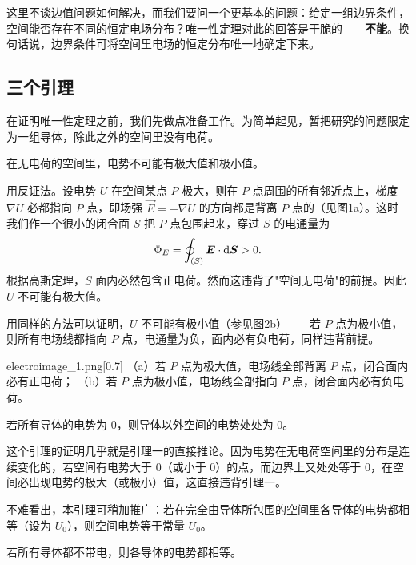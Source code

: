 这里不谈边值问题如何解决，而我们要问一个更基本的问题：给定一组边界条件，空间能否存在不同的恒定电场分布？唯一性定理对此的回答是干脆的——\textbf{不能}。换句话说，边界条件可将空间里电场的恒定分布唯一地确定下来。

\subsection{三个引理}

在证明唯一性定理之前，我们先做点准备工作。为简单起见，暂把研究的问题限定为一组导体，除此之外的空间里没有电荷。

\begin{law}
    在无电荷的空间里，电势不可能有极大值和极小值。
\end{law}

用反证法。设电势 $U$ 在空间某点 $P$ 极大，则在 $P$ 点周围的所有邻近点上，梯度 $\nabla U$ 必都指向 $P$ 点，即场强 $\vec{E} = -\nabla U$ 的方向都是背离 $P$ 点的（见图1a）。这时我们作一个很小的闭合面 $S$ 把 $P$ 点包围起来，穿过 $S$ 的电通量为
\[\Phi_E = \oint_{(S)} \vec{E} \cdot \dif \vec{S} > 0.\]
根据高斯定理，$S$ 面内必然包含正电荷。然而这违背了"空间无电荷"的前提。因此 $U$ 不可能有极大值。

用同样的方法可以证明，$U$ 不可能有极小值（参见图2b）——若 $P$ 点为极小值，则所有电场线都指向 $P$ 点，电通量为负，面内必有负电荷，同样违背前提。

\begin{singlefigure}{electroimage_1.png}[0.7]
    （a）若 $P$ 点为极大值，电场线全部背离 $P$ 点，闭合面内必有正电荷；
    （b）若 $P$ 点为极小值，电场线全部指向 $P$ 点，闭合面内必有负电荷。
\end{singlefigure}

\begin{law}
    若所有导体的电势为 $0$，则导体以外空间的电势处处为 $0$。
\end{law}

这个引理的证明几乎就是引理一的直接推论。因为电势在无电荷空间里的分布是连续变化的，若空间有电势大于 $0$（或小于 $0$）的点，而边界上又处处等于 $0$，在空间必出现电势的极大（或极小）值，这直接违背引理一。

不难看出，本引理可稍加推广：若在完全由导体所包围的空间里各导体的电势都相等（设为 $U_0$），则空间电势等于常量 $U_0$。

\begin{law}
    若所有导体都不带电，则各导体的电势都相等。
\end{law}


